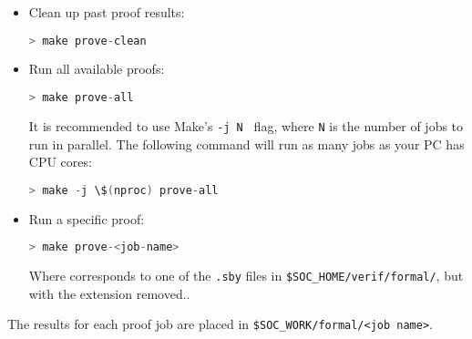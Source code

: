 \begin{itemize}

\item Clean up past proof results:

\begin{lstlisting}[style=block, language=verilog]
> make prove-clean
\end{lstlisting}

\item Run all available proofs:

\begin{lstlisting}[style=block, language=verilog]
> make prove-all
\end{lstlisting}

It is recommended to use Make's {\tt -j N } flag, where {\tt N} is the
number of jobs to run in parallel.
The following command will run as many jobs as your PC has CPU cores:

\begin{lstlisting}[style=block, language=verilog]
> make -j \$(nproc) prove-all
\end{lstlisting}

\item Run a specific proof:

\begin{lstlisting}[style=block, language=verilog]
> make prove-<job-name>
\end{lstlisting}

Where {\tt <job-name>} corresponds to one of the {\tt .sby} files in
{\tt \$SOC\_HOME/verif/formal/}, but with the extension removed..

\end{itemize}

The results for each proof job are placed in
{\tt \$SOC\_WORK/formal/<job name>}.



